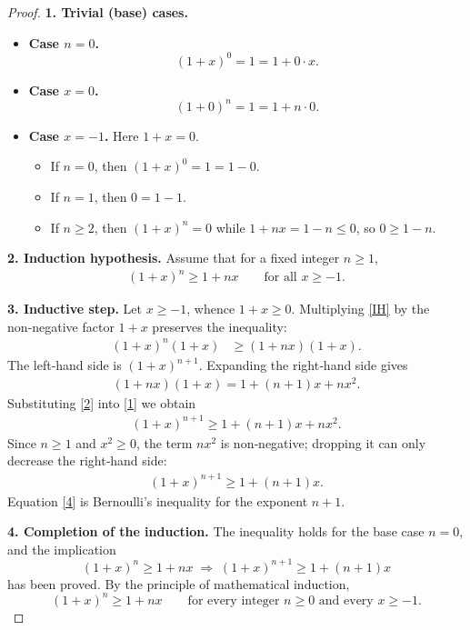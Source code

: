\begin{proof}
\textbf{1. Trivial (base) cases.}
\begin{itemize}
\item \textbf{Case $n=0$.}  
\[
(1+x)^{0}=1=1+0\cdot x .
\]

\item \textbf{Case $x=0$.}  
\[
(1+0)^{n}=1=1+n\cdot0 .
\]

\item \textbf{Case $x=-1$.}  Here $1+x=0$.
\begin{itemize}
\item If $n=0$, then $(1+x)^{0}=1=1-0$.
\item If $n=1$, then $0=1-1$.
\item If $n\ge2$, then $(1+x)^{n}=0$ while $1+nx=1-n\le0$, so $0\ge1-n$.
\end{itemize}
\end{itemize}

\medskip\noindent\textbf{2. Induction hypothesis.}  
Assume that for a fixed integer $n\ge1$,
\begin{align}
(1+x)^{n}\ge 1+nx \qquad\text{for all }x\ge-1 .
\tag{IH}
\end{align}

\medskip\noindent\textbf{3. Inductive step.}  
Let $x\ge-1$, whence $1+x\ge0$. Multiplying \eqref{IH} by the non‑negative factor $1+x$ preserves the inequality:
\begin{align}
(1+x)^{n}(1+x) &\ge (1+nx)(1+x) .
\tag{1}
\end{align}
The left‑hand side is $(1+x)^{n+1}$. Expanding the right‑hand side gives
\begin{align}
(1+nx)(1+x)=1+(n+1)x+nx^{2}.
\tag{2}
\end{align}
Substituting \eqref{2} into \eqref{1} we obtain
\begin{align}
(1+x)^{n+1}\ge 1+(n+1)x+nx^{2}.
\tag{3}
\end{align}
Since $n\ge1$ and $x^{2}\ge0$, the term $nx^{2}$ is non‑negative; dropping it can only decrease the right‑hand side:
\begin{align}
(1+x)^{n+1}\ge 1+(n+1)x .
\tag{4}
\end{align}
Equation \eqref{4} is Bernoulli’s inequality for the exponent $n+1$.

\medskip\noindent\textbf{4. Completion of the induction.}  
The inequality holds for the base case $n=0$, and the implication
\[
(1+x)^{n}\ge1+nx\;\Longrightarrow\;(1+x)^{n+1}\ge1+(n+1)x
\]
has been proved. By the principle of mathematical induction,  
\[
(1+x)^{n}\ge1+nx\qquad\text{for every integer }n\ge0\text{ and every }x\ge-1 .
\]


\end{proof}
